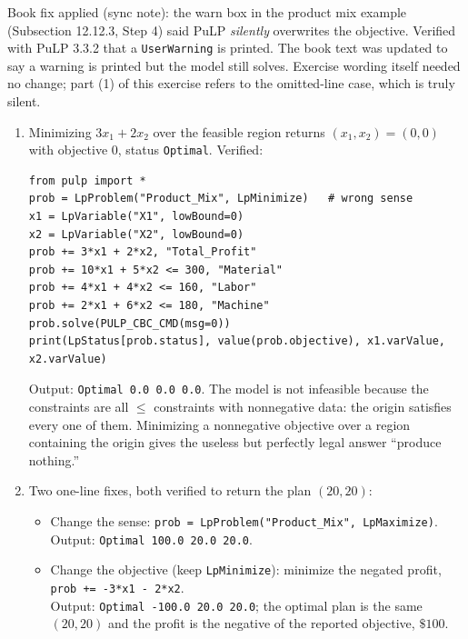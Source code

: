 \begin{qaflag}
Book fix applied (sync note): the warn box in the product mix example
(Subsection 12.12.3, Step 4) said PuLP
\emph{silently} overwrites the objective. Verified with PuLP 3.3.2 that a
\texttt{UserWarning} is printed. The book text was updated to say a warning
is printed but the model still solves. Exercise wording itself needed no
change; part (1) of this exercise refers to the omitted-line case, which is
truly silent.
\end{qaflag}


\begin{enumerate}
\item Minimizing $3x_1 + 2x_2$ over the feasible region returns
$(x_1, x_2) = (0, 0)$ with objective $0$, status \texttt{Optimal}. Verified:

\begin{verbatim}
from pulp import *
prob = LpProblem("Product_Mix", LpMinimize)   # wrong sense
x1 = LpVariable("X1", lowBound=0)
x2 = LpVariable("X2", lowBound=0)
prob += 3*x1 + 2*x2, "Total_Profit"
prob += 10*x1 + 5*x2 <= 300, "Material"
prob += 4*x1 + 4*x2 <= 160, "Labor"
prob += 2*x1 + 6*x2 <= 180, "Machine"
prob.solve(PULP_CBC_CMD(msg=0))
print(LpStatus[prob.status], value(prob.objective), x1.varValue, x2.varValue)
\end{verbatim}

Output: \texttt{Optimal 0.0 0.0 0.0}. The model is not infeasible because
the constraints are all $\leq$ constraints with nonnegative data: the origin
satisfies every one of them. Minimizing a nonnegative objective over a region
containing the origin gives the useless but perfectly legal answer ``produce
nothing.''

\item Two one-line fixes, both verified to return the plan $(20, 20)$:
\begin{itemize}
\item Change the sense:
\texttt{prob = LpProblem("Product\_Mix", LpMaximize)}. \\
Output: \texttt{Optimal 100.0 20.0 20.0}.
\item Change the objective (keep \texttt{LpMinimize}): minimize the negated
profit, \texttt{prob += -3*x1 - 2*x2}. \\
Output: \texttt{Optimal -100.0 20.0 20.0}; the optimal plan is the same
$(20,20)$ and the profit is the negative of the reported objective,
$\$100$.
\end{itemize}


\end{enumerate}
